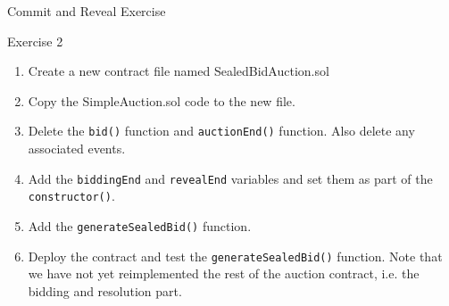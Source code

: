 \documentclass[handout]{beamer}
\begin{document}
\begin{frame}{Commit and Reveal Exercise}

	\begin{exercise}{Exercise 2}
		\begin{enumerate}
			\item Create a new contract file named SealedBidAuction.sol
			\item Copy the SimpleAuction.sol code to the new file.
			\item Delete the \texttt{bid()} function and \texttt{auctionEnd()} function. Also delete any associated events.
			\item Add the \texttt{biddingEnd} and \texttt{revealEnd} variables and set them as part of the \texttt{constructor()}.
			\item Add the \texttt{generateSealedBid()} function.
			\item Deploy the contract and test the \texttt{generateSealedBid()} function. Note that we have not yet reimplemented the rest of the auction contract, i.e. the bidding and resolution part. 
		\end{enumerate}
	\end{exercise}
	
\end{frame}
\end{document}
